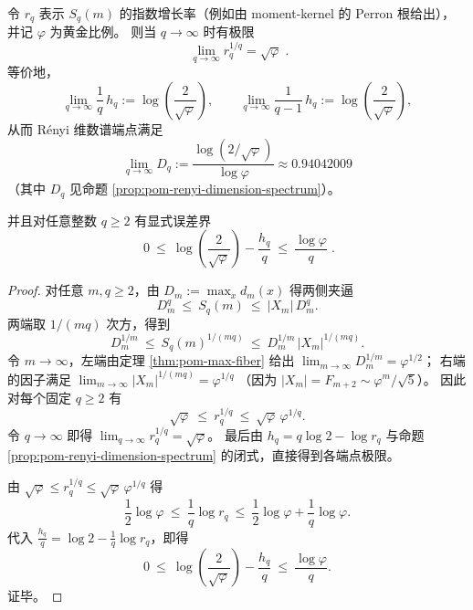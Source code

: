 \begin{proposition}\label{prop:pom-rq-qinfty-endpoint}
令 \(r_q\) 表示 \(S_q(m)\) 的指数增长率（例如由 moment-kernel 的 Perron 根给出），并记 \(\varphi\) 为黄金比例。
则当 \(q\to\infty\) 时有极限
\[
\boxed{\;
\lim_{q\to\infty} r_q^{1/q}=\sqrt{\varphi}\; }.
\]
等价地，
\[
\lim_{q\to\infty}\frac{1}{q}\,h_q
:=\log\!\left(\frac{2}{\sqrt{\varphi}}\right),
\qquad
\lim_{q\to\infty}\frac{1}{q-1}\,h_q
:=\log\!\left(\frac{2}{\sqrt{\varphi}}\right),
\]
从而 Rényi 维数谱端点满足
\[
\lim_{q\to\infty}D_q
:=\frac{\log\!\left(2/\sqrt{\varphi}\right)}{\log\varphi}
\approx 0.94042009
\]
（其中 \(D_q\) 见命题 \ref{prop:pom-renyi-dimension-spectrum}）。
\par
并且对任意整数 \(q\ge 2\) 有显式误差界
\[
\boxed{\;
0\ \le\ \log\!\left(\frac{2}{\sqrt{\varphi}}\right)-\frac{h_q}{q}\ \le\ \frac{\log\varphi}{q}\; }.
\]
\end{proposition}
\begin{proof}
对任意 \(m,q\ge 2\)，由
\(
D_m:=\max_x d_m(x)
\)
得两侧夹逼
\[
D_m^q\ \le\ S_q(m)\ \le\ |X_m|\,D_m^q.
\]
两端取 \(1/(mq)\) 次方，得到
\[
D_m^{1/m}\ \le\ S_q(m)^{1/(mq)}\ \le\ D_m^{1/m}\,|X_m|^{1/(mq)}.
\]
令 \(m\to\infty\)，左端由定理 \ref{thm:pom-max-fiber} 给出
\(
\lim_{m\to\infty}D_m^{1/m}=\varphi^{1/2}
\)；
右端的因子满足
\(
\lim_{m\to\infty}|X_m|^{1/(mq)}=\varphi^{1/q}
\)
（因为 \(|X_m|=F_{m+2}\sim \varphi^m/\sqrt5\)）。
因此对每个固定 \(q\ge 2\) 有
\[
\sqrt{\varphi}\ \le\ r_q^{1/q}\ \le\ \sqrt{\varphi}\,\varphi^{1/q}.
\]
令 \(q\to\infty\) 即得 \(\lim_{q\to\infty}r_q^{1/q}=\sqrt{\varphi}\)。
最后由 \(h_q=q\log 2-\log r_q\) 与命题 \ref{prop:pom-renyi-dimension-spectrum} 的闭式，直接得到各端点极限。
\par
由 \(\sqrt{\varphi}\le r_q^{1/q}\le \sqrt{\varphi}\,\varphi^{1/q}\) 得
\[
\frac{1}{2}\log\varphi\ \le\ \frac{1}{q}\log r_q\ \le\ \frac{1}{2}\log\varphi+\frac{1}{q}\log\varphi.
\]
代入 \(\frac{h_q}{q}=\log 2-\frac{1}{q}\log r_q\)，即得
\[
0\ \le\ \log\!\left(\frac{2}{\sqrt{\varphi}}\right)-\frac{h_q}{q}\ \le\ \frac{\log\varphi}{q}.
\]
证毕。
\end{proof}

